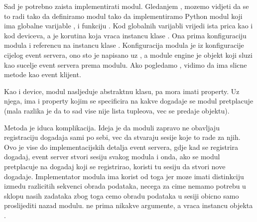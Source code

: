\documentclass[letterpaper,10pt,croatian]{sphinxmanual}
\begin{document}
\sphinxAtStartPar
Sad je potrebno zaista implementirati modul. Gledanjem ,
mozemo vidjeti da se to radi tako da definiramo modul tako da implementiramo
Python modul koji ima globalne varijable ,
 i funkciju . Kod globalnih varijabli vrijedi
ista prica kao i kod deviceva, a  je korutina koja vraca instancu
klase . Ona prima konfiguraciju modula i
referencu na instancu klase .
Konfiguracija modula je iz konfiguracije cijelog event servera, ono sto je
napisano uz , a module engine je objekt koji
sluzi kao sucelje event servera prema modulu. Ako pogledamo ,
vidimo da ima slicne metode kao event klijent.

\sphinxAtStartPar
Kao i device, modul nasljeduje  abstraktnu klasu, pa mora
imati  property.  Uz njega, ima i property 
kojim se specificira na kakve dogadaje se modul pretplacuje (mala razlika je da
to sad vise nije lista tupleova, vec se predaje
 objektu).

\sphinxAtStartPar
Metoda  je iduca komplikacija. Ideja je da moduli zapravo ne
obavljaju registraciju dogadaja sami po sebi, vec da stvaraju sesije koje to
rade za njih. Ovo je vise do implementacijskih detalja event servera, gdje kad
se registrira dogadaj, event server stvori sesiju svakog modula i onda, ako se
modul pretplacuje na dogadaj koji se registrirao, koristi tu sesiju da stvori
nove dogadaje. Implementator modula ima korist od toga jer moze imati
distinkciju izmedu razlicitih sekvenci obrada podataka, necega za cime nemamo
potrebu u sklopu nasih zadataka \sphinxhyphen{} zbog toga cemo obradu podataka u sesiji
obicno samo proslijediti nazad modulu.  ne prima nikakve
argumente, a vraca instancu objekta .
\end{document}

